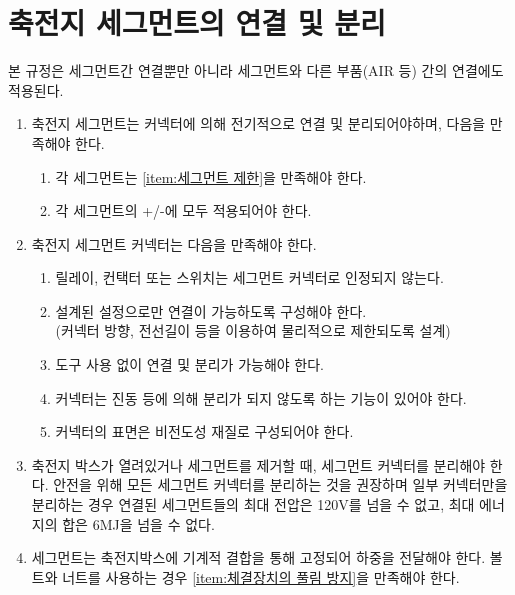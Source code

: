 \documentclass[final,a4paper,10pt]{report}
\begin{document}
\section{축전지 세그먼트의 연결 및 분리} \label{section:세그먼트 연결}
본 규정은 세그먼트간 연결뿐만 아니라 세그먼트와 다른 부품(AIR 등) 간의 연결에도 적용된다.
\begin{enumerate}
  \item 축전지 세그먼트는 커넥터에 의해 전기적으로 연결 및 분리되어야하며, 다음을 만족해야 한다.
    \begin{enumerate}
      \item 각 세그먼트는 \cref{item:세그먼트 제한}을 만족해야 한다.
      \item 각 세그먼트의 +/-에 모두 적용되어야 한다.
    \end{enumerate}
    
  \item 축전지 세그먼트 커넥터는 다음을 만족해야 한다.
    \begin{enumerate}
      \item 릴레이, 컨택터 또는 스위치는 세그먼트 커넥터로 인정되지 않는다.
      \item 설계된 설정으로만 연결이 가능하도록 구성해야 한다.\\
        (커넥터 방향, 전선길이 등을 이용하여 물리적으로 제한되도록 설계)
      \item 도구 사용 없이 연결 및 분리가 가능해야 한다.
      \item 커넥터는 진동 등에 의해 분리가 되지 않도록 하는 기능이 있어야 한다.
      \item 커넥터의 표면은 비전도성 재질로 구성되어야 한다.
    \end{enumerate}
    
  \item 축전지 박스가 열려있거나 세그먼트를 제거할 때, 세그먼트 커넥터를 분리해야 한다. 안전을 위해 모든 세그먼트 커넥터를 분리하는 것을 권장하며 일부 커넥터만을 분리하는 경우 연결된 세그먼트들의 최대 전압은 120V를 넘을 수 없고, 최대 에너지의 합은 6MJ을 넘을 수 없다.
  \item 세그먼트는 축전지박스에 기계적 결합을 통해 고정되어 하중을 전달해야 한다. 볼트와 너트를 사용하는 경우 \cref{item:체결장치의 풀림 방지}을 만족해야 한다.
\end{enumerate}
\end{document}
